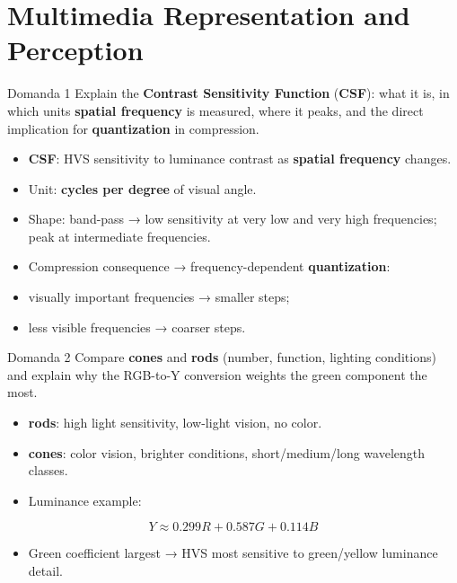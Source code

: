 \section{Multimedia Representation and Perception}




\begin{questionbox}{Domanda 1}
Explain the \textbf{Contrast Sensitivity Function} (\textbf{CSF}): what it is, in which units \textbf{spatial frequency} is measured, where it peaks, and the direct implication for \textbf{quantization} in compression.
\end{questionbox}


\begin{itemize}
  \item \textbf{\textbf{CSF}}: HVS sensitivity to luminance contrast as \textbf{spatial frequency} changes.
  \item Unit: \textbf{cycles per degree} of visual angle.
  \item Shape: band-pass → low sensitivity at very low and very high frequencies; peak at intermediate frequencies.
  \item Compression consequence → frequency-dependent \textbf{quantization}:
  \item visually important frequencies → smaller steps;
  \item less visible frequencies → coarser steps.
\end{itemize}



\begin{questionbox}{Domanda 2}
Compare \textbf{cones} and \textbf{rods} (number, function, lighting conditions) and explain why the RGB-to-Y conversion weights the green component the most.
\end{questionbox}


\begin{itemize}
  \item \textbf{\textbf{rods}}: high light sensitivity, low-light vision, no color.
  \item \textbf{\textbf{cones}}: color vision, brighter conditions, short/medium/long wavelength classes.
  \item Luminance example:
\end{itemize}


$$
Y \approx 0.299R + 0.587G + 0.114B
$$


\begin{itemize}
  \item Green coefficient largest → HVS most sensitive to green/yellow luminance detail.
\end{itemize}



